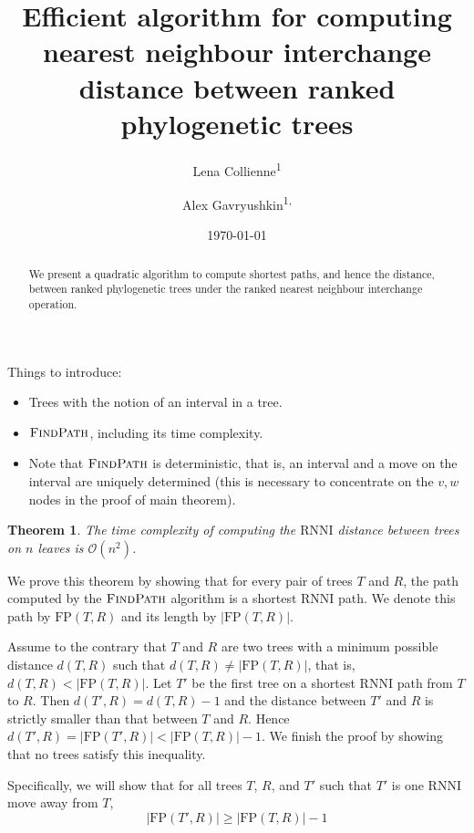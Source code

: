 \documentclass{amsart}
\title[Computing $\rnni$ distance]{Efficient algorithm for computing nearest neighbour interchange distance between ranked phylogenetic trees}
\date{\today}
\author{Lena Collienne\textsuperscript{1}}
\author{Alex Gavryushkin\textsuperscript{1, \Letter}}
\newtheorem{theorem}{Theorem}
\newcommand{\rnni}{\mathrm{RNNI}}
\newcommand{\findpath}{\textsc{FindPath}}
\newcommand{\fp}{\mathrm{FP}}
\renewcommand{\O}{\mathcal O}
\begin{document}
\begin{abstract}
We present a quadratic algorithm to compute shortest paths, and hence the distance, between ranked phylogenetic trees under the ranked nearest neighbour interchange operation.
\end{abstract}


\maketitle

Things to introduce:

\begin{itemize}
\item Trees with the notion of an interval in a tree.
\item $\findpath$, including its time complexity.
\item Note that $\findpath$ is deterministic, that is, an interval and a move on the interval are uniquely determined (this is necessary to concentrate on the $v, w$ nodes in the proof of main theorem).
\end{itemize}

\begin{theorem}
The time complexity of computing the $\rnni$ distance between trees on $n$ leaves is $\O(n^2)$.
\end{theorem}

\proof
We prove this theorem by showing that for every pair of trees $T$ and $R$, the path computed by the $\findpath$ algorithm is a shortest $\rnni$ path.
We denote this path by $\fp(T, R)$ and its length by $|\fp(T, R)|$.

Assume to the contrary that $T$ and $R$ are two trees with a minimum possible distance $d(T, R)$ such that $d(T,R) \neq |\fp(T,R)|$, that is, $d(T,R) < |\fp(T,R)|$.
Let $T'$ be the first tree on a shortest $\rnni$ path from $T$ to $R$.
Then $d(T',R) = d(T, R) - 1$ and the distance between $T'$ and $R$ is strictly smaller than that between $T$ and $R$.
Hence $d(T', R) = |\fp(T',R)| < |\fp(T,R)| - 1$.
We finish the proof by showing that no trees satisfy this inequality.

Specifically, we will show that for all trees $T$, $R$, and $T'$ such that $T'$ is one $\rnni$ move away from $T$,
\begin{equation}
	|\fp(T',R)| \geq |\fp(T,R)| - 1
 	\label{eqn:iff_inequality}
\end{equation}
\end{document}
